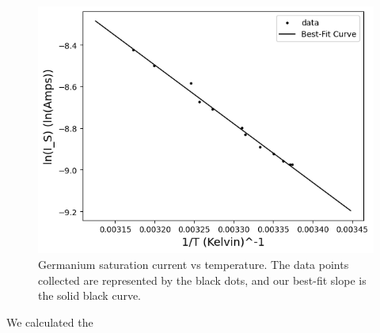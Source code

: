 \documentclass[12pt,letterpaper,twocolumn]{article}
\begin{document}
\begin{figure}[h]
	\includegraphics[width = .5\textwidth]{linGeSatCurrent.png}
	\caption{Germanium saturation current vs temperature. The data points collected are represented by the black dots, and our best-fit slope is the solid black curve.\label{g4}}
\end{figure}
We calculated the 

%
%
%
%



%
%
\end{document}
